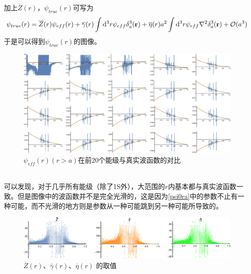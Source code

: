 \documentclass[hyperref,cs4size,titlepage,twoside]{ctexart}
\begin{document}
加上$\overline{Z}(r)$，$\psi_{true}(r)$可写为
\begin{equation}\label{psi0ra}
  \psi_{true}(r)=\overline{Z}(r)\psi_{eff}(r)+\overline{\gamma}(r)\int\dd^3r\psi_{eff}\delta^3_a(\vb{r})+\overline{\eta}(r)a^2\int\dd^3r\psi_{eff}\laplacian{\delta^3_a(\vb{r})}+\mathcal{O}(a^3)
\end{equation}
于是可以得到$\psi_{true}(r)$的图像。
\begin{figure}[!htbp]
  \centering
  \includegraphics[width=6in]{psirmodified2.eps}
  \caption{$\psi_{eff}(r)(r>a)$在前20个能级与真实波函数的对比}
\end{figure}\\
可以发现，对于几乎所有能级（除了1S外），大范围的$r$内基本都与真实波函数一致。但是图像中的波函数并不是完全光滑的，这是因为\eqref{psi0ra}中的参数不止有一种可能，而不光滑的地方则是参数从一种可能跳到另一种可能所导致的。
\begin{figure}[!htbp]
  \centering
  \includegraphics[width=6in]{psirmodified2_2.eps}
  \caption{$\overline{Z}(r)$、$\overline{\gamma}(r)$、$\overline{\eta}(r)$ 的取值}
\end{figure}
\end{document}
